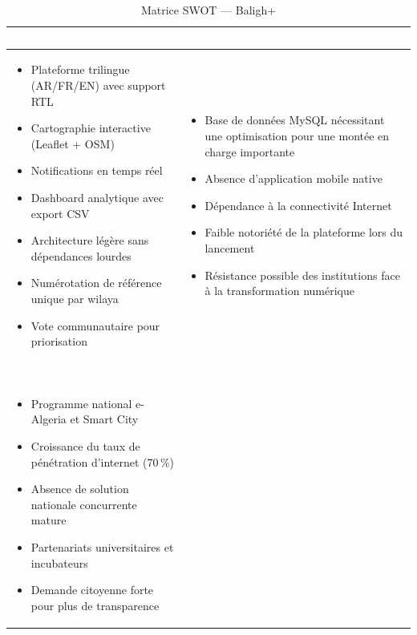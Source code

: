 \documentclass[12pt,a4paper]{report}
\newcommand{\thdcell}[1]{%
  \cellcolor{tabhead}\textbf{\textcolor{white}{#1}}%
}
\begin{document}
\begin{table}[H]
  \centering
  \caption{Matrice SWOT — Baligh+}
  \renewcommand{\arraystretch}{1.4}
  \begin{tabularx}{\linewidth}{XX}
    \toprule
    \rowcolor{primary}
    \thdcell{FORCES} & \thdcell{FAIBLESSES} \\
    \midrule
    \begin{itemize}[leftmargin=*,topsep=2pt,itemsep=1pt]
      \item Plateforme trilingue (AR/FR/EN) avec support RTL
      \item Cartographie interactive (Leaflet + OSM)
      \item Notifications en temps réel
      \item Dashboard analytique avec export CSV
      \item Architecture légère sans dépendances lourdes
      \item Numérotation de référence unique par wilaya
      \item Vote communautaire pour priorisation
    \end{itemize}
    &
    \begin{itemize}[leftmargin=*,topsep=2pt,itemsep=1pt]
      \item Base de données MySQL nécessitant une optimisation pour une montée
            en charge importante
      \item Absence d'application mobile native
      \item Dépendance à la connectivité Internet
      \item Faible notoriété de la plateforme lors du lancement
      \item Résistance possible des institutions face à la transformation numérique
    \end{itemize}
    \\
    \midrule
    \rowcolor{primary}
    \thdcell{OPPORTUNITÉS} & \thdcell{MENACES} \\
    \midrule
    \begin{itemize}[leftmargin=*,topsep=2pt,itemsep=1pt]
      \item Programme national e-Algeria et Smart City
      \item Croissance du taux de pénétration d'internet (70\,\%)
      \item Absence de solution nationale concurrente mature
      \item Partenariats universitaires et incubateurs
      \item Demande citoyenne forte pour plus de transparence

\end{itemize}
\end{tabularx}
\end{table}
\end{document}
